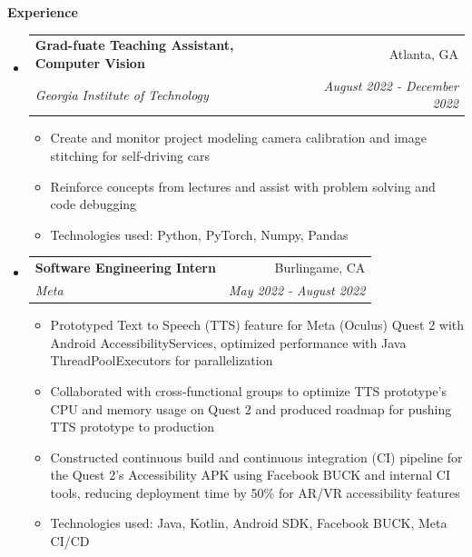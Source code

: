 \documentclass[letterpaper,10pt]{article}
\makeatletter
\newcommand{\resitem}[1]{\item #1 \vspace{-3.5pt}}  %
\newcommand{\resheading}[1]{{\large \colorbox{mygrey}{\begin{minipage}{0.989\textwidth}{\textbf{#1 \vphantom{p\^{E}}}}\end{minipage}}}}
\newcommand{\ressubheading}[4]{
\begin{tabular*}{7.0in}{l@{\extracolsep{\fill}}r}  
		\textbf{#1} & #2 \\
		\textit{#3} & \textit{#4} \\
\end{tabular*}\vspace{-6pt}}  %
\makeatother
\begin{document}
\resheading{Experience}

\begin{itemize}
\item
    \ressubheading{Grad-fuate Teaching Assistant, Computer Vision}{Atlanta, GA}{Georgia Institute of Technology}{August 2022 - December 2022}
    \begin{itemize}
        \resitem{Create and monitor project modeling camera calibration and image stitching for self-driving cars}
        \resitem{Reinforce concepts from lectures and assist with problem solving and code debugging}
        \resitem{Technologies used: Python, PyTorch, Numpy, Pandas}
    \end{itemize}
\item
    \ressubheading{Software Engineering Intern}{Burlingame, CA}{Meta}{May 2022 - August 2022}
    \begin{itemize}
        \resitem{Prototyped Text to Speech (TTS) feature for Meta (Oculus) Quest 2 with Android AccessibilityServices, optimized performance with Java ThreadPoolExecutors for parallelization}
        \resitem{Collaborated with cross-functional groups to optimize TTS prototype's CPU and memory usage on Quest 2 and produced roadmap for pushing TTS prototype to production}
        \resitem{Constructed continuous build and continuous integration (CI) pipeline for the Quest 2's Accessibility APK using Facebook BUCK and internal CI tools, reducing deployment time by 50\% for AR/VR accessibility features}
        \resitem{Technologies used: Java, Kotlin, Android SDK, Facebook BUCK, Meta CI/CD}
    \end{itemize}

\end{itemize}
\end{document}
